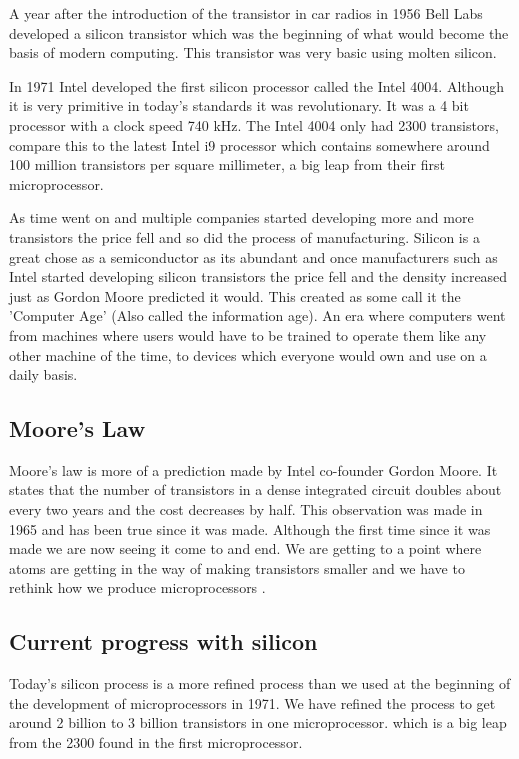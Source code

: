 \documentclass[journal]{IEEEtran}
\begin{document}
A year after the introduction of the transistor in car radios in 1956 Bell Labs \cite{8896076320180101} developed a silicon transistor which was the beginning of what would become the basis of modern computing. This transistor was very basic using molten silicon.

In 1971 Intel developed the first silicon processor called the Intel 4004. Although it is very primitive in today's standards it was revolutionary. It was a 4 bit processor with a clock speed 740 kHz. The Intel 4004 only had 2300 transistors, compare this to the latest Intel i9 processor which contains somewhere around 100 million transistors per square millimeter, a big leap from their first microprocessor. 

As time went on and multiple companies started developing more and more transistors the price fell and so did the process of manufacturing. Silicon is a great chose as a semiconductor as its abundant and once manufacturers such as Intel started developing silicon transistors the price fell and the density increased just as Gordon Moore predicted it would. This created as some call it the 'Computer Age' (Also called the information age). An era where computers went from machines where users would have to be trained to operate them like any other machine of the time, to devices which everyone would own and use on a daily basis.

\subsection{Moore's Law}
Moore's law \cite{12560013020170101} is more of a prediction made by Intel co-founder Gordon Moore. It states that the number of transistors in a dense integrated circuit doubles about every two years and the cost decreases by half. This observation was made in 1965 and has been true since it was made. Although the first time since it was made we are now seeing it come to and end. We are getting to a point where atoms are getting in the way of making transistors smaller and we have to rethink how we produce microprocessors \cite{591665}.

\subsection{Current progress with silicon}
Today's silicon process is a more refined process than we used at the beginning of the development of microprocessors in 1971. We have refined the process to get around 2 billion to 3 billion transistors in one microprocessor. which is a big leap from the 2300 found in the first microprocessor.
\end{document}

